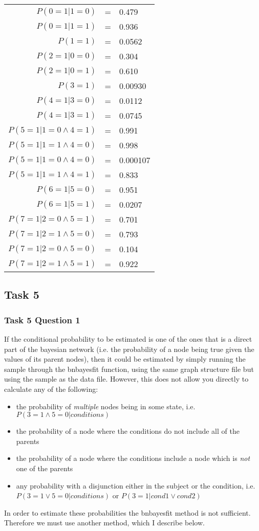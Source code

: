 \documentclass[a4paper,11pt]{article}
\begin{document}
\begin{center}
\begin{tabular}{r c l}
	$P(0=1|1=0)$					& = & 0.479 \\
	$P(0=1|1=1)$					& = & 0.936 \\
	$P(1=1)$						& = & 0.0562 \\
	$P(2=1|0=0)$					& = & 0.304 \\
	$P(2=1|0=1)$					& = & 0.610 \\
	$P(3=1)$						& = & 0.00930 \\
	$P(4=1|3=0)$					& = & 0.0112 \\
	$P(4=1|3=1)$					& = & 0.0745 \\
	$P(5=1|1=0\wedge{}4=1)$			& = & 0.991 \\
	$P(5=1|1=1\wedge{}4=0)$			& = & 0.998 \\
	$P(5=1|1=0\wedge{}4=0)$			& = & 0.000107 \\
	$P(5=1|1=1\wedge{}4=1)$			& = & 0.833 \\
	$P(6=1|5=0)$					& = & 0.951 \\
	$P(6=1|5=1)$					& = & 0.0207 \\
	$P(7=1|2=0\wedge{}5=1)$			& = & 0.701 \\
	$P(7=1|2=1\wedge{}5=0)$			& = & 0.793 \\
	$P(7=1|2=0\wedge{}5=0)$			& = & 0.104 \\
	$P(7=1|2=1\wedge{}5=1)$			& = & 0.922
\end{tabular}
\end{center}

\subsection{Task 5}
\subsubsection{Task 5 Question 1}

If the conditional probability to be estimated is one of the ones that is a direct part of the bayesian network (i.e. the probability of a node being true given the values of its parent nodes), then it could be estimated by simply running the sample through the bnbayesfit function, using the same graph structure file but using the sample as the data file.  However, this does not allow you directly to calculate any of the following:
\begin{itemize}
	\item the probability of \textit{multiple} nodes being in some state, i.e. $P(3=1\wedge{}5=0|conditions)$
	\item the probability of a node where the conditions do not include all of the parents
	\item the probability of a node where the conditions include a node which is \textit{not} one of the parents
	\item any probability with a disjunction either in the subject or the condition, i.e. ${P(3=1\vee{}5=0|conditions)}$ or ${P(3=1|cond1\vee{}cond2)}$
\end{itemize}
In order to estimate these probabilities the bnbayesfit method is not sufficient.  Therefore we must use another method, which I describe below.
\end{document}
